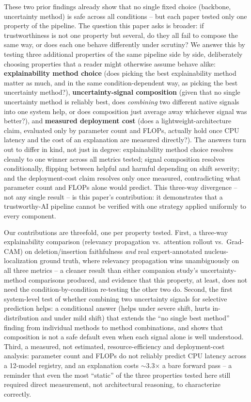 \documentclass[runningheads]{llncs}
\begin{document}
These two prior findings already show that no single fixed choice
(backbone, uncertainty method) is safe across all conditions -- but each
paper tested only one property of the pipeline. The question this paper
asks is broader: if trustworthiness is not one property but several, do
they all fail to compose the same way, or does each one behave
differently under scrutiny? We answer this by testing three additional
properties of the same pipeline side by side, deliberately choosing
properties that a reader might otherwise assume behave alike:
\textbf{explainability method choice} (does picking the best
explainability method matter as much, and in the same
condition-dependent way, as picking the best uncertainty method?),
\textbf{uncertainty-signal composition} (given that no single uncertainty
method is reliably best, does \emph{combining} two different native
signals into one system help, or does composition just average away
whichever signal was better?), and \textbf{measured deployment cost} (does
a lightweight-architecture claim, evaluated only by parameter count and
FLOPs, actually hold once CPU latency and the cost of an explanation are
measured directly?). The answers turn out to differ in kind, not just in
degree: explainability method choice resolves cleanly to one winner
across all metrics tested; signal composition resolves conditionally,
flipping between helpful and harmful depending on shift severity; and the
deployment-cost claim resolves only once measured, contradicting what
parameter count and FLOPs alone would predict. This three-way divergence
-- not any single result -- is this paper's contribution: it demonstrates
that a trustworthy-AI pipeline cannot be verified with one strategy
applied uniformly to every component.

Our contributions are threefold, one per property tested. First, a
three-way explainability comparison (relevancy propagation vs.\ attention
rollout vs.\ Grad-CAM) on deletion/insertion faithfulness \emph{and} real
expert-annotated nucleus-localization ground truth, where relevancy
propagation wins unambiguously on all three metrics -- a cleaner result
than either companion study's uncertainty-method comparisons produced,
and evidence that this property, at least, does not need the
condition-by-condition re-testing the other two do. Second, the first
system-level test of whether combining two uncertainty signals for
selective prediction helps: a conditional answer (helps under severe
shift, hurts in-distribution and under mild shift) that extends the ``no
single best method'' finding from individual methods to method
combinations, and shows that composition is not a safe default even when
each signal alone is well understood. Third, a measured, not estimated,
resource-efficiency and deployment-cost analysis: parameter count and
FLOPs do not reliably predict CPU latency across a 12-model registry, and
an explanation costs $\sim$3.3$\times$ a bare forward pass -- a reminder
that even the most ``static'' of the three properties tested here still
required direct measurement, not architectural reasoning, to characterize
correctly.
\end{document}
